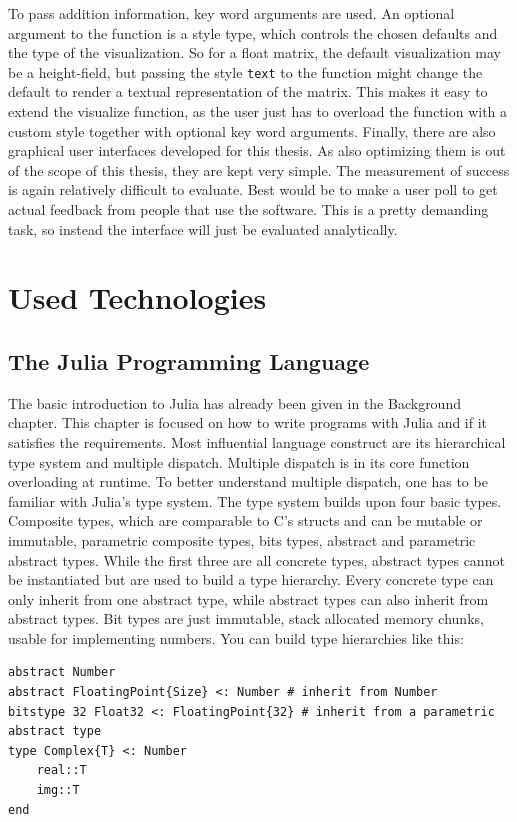 To pass addition information, key word arguments are used. An optional argument to the function is a style type, which controls the chosen defaults and the type of the visualization.
So for a float matrix, the default visualization may be a height-field, but passing the style \texttt{text} to the function might change the default to render a textual representation of the matrix.
This makes it easy to extend the visualize function, as the user just has to overload the function with a custom style together with optional key word arguments.
Finally, there are also graphical user interfaces developed for this thesis. As also optimizing them is out of the scope of this thesis, they are kept very simple.
The measurement of success is again relatively difficult to evaluate.
Best would be to make a user poll to get actual feedback from people that use the software. This is a pretty demanding task, so instead the interface will just be evaluated analytically.


\section{Used Technologies}

\subsection{The Julia Programming Language}

The basic introduction to Julia has already been given in the Background chapter.
This chapter is focused on how to write programs with Julia and if it satisfies the requirements.
Most influential language construct are its hierarchical type system and multiple dispatch.
Multiple dispatch is in its core function overloading at runtime. 
To better understand multiple dispatch, one has to be familiar with Julia's type system.
The type system builds upon four basic types. 
Composite types, which are comparable to C's structs and can be mutable or immutable, parametric composite types, bits types, abstract and parametric abstract types.
While the first three are all concrete types, abstract types cannot be instantiated but are used to build a type hierarchy.
Every concrete type can only inherit from one abstract type, while abstract types can also inherit from abstract types.
Bit types are just immutable, stack allocated memory chunks, usable for implementing numbers.
You can build type hierarchies like this:
\begin{lstlisting}
abstract Number
abstract FloatingPoint{Size} <: Number # inherit from Number
bitstype 32 Float32 <: FloatingPoint{32} # inherit from a parametric abstract type
type Complex{T} <: Number
    real::T
    img::T
end
\end{lstlisting}

